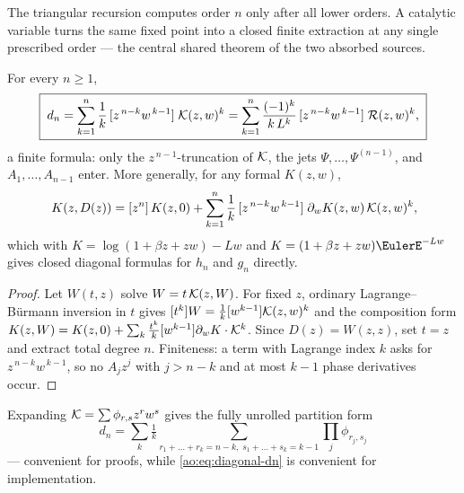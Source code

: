 The triangular recursion computes order $n$ only after all lower
orders.  A catalytic variable turns the same fixed point into a
closed finite extraction at any single prescribed order --- the
central shared theorem of the two absorbed sources.

\begin{theorem}
\label{ao:thm:diagonal}
For every $n\ge1$,
\begin{equation}
 \boxed{\;
 d_n=\sum_{k=1}^{n}\frac1k\,
 [z^{\,n-k}w^{\,k-1}]\;\mathcal K(z,w)^{k}
 =\sum_{k=1}^{n}\frac{(-1)^{k}}{k\,L^{k}}\,
 [z^{\,n-k}w^{\,k-1}]\;\mathcal R(z,w)^{k},
 \;}
 \label{ao:eq:diagonal-dn}
\end{equation}
a finite formula: only the $z^{\,n-1}$-truncation of $\mathcal K$, the jets
$\Psi,\dots,\Psi^{(n-1)}$, and $A_1,\dots,A_{n-1}$ enter.  More
generally, for any formal $K(z,w)$,
\begin{equation}
 [z^{n}]\,K(z,D(z))
 =[z^{n}]\,K(z,0)
 +\sum_{k=1}^{n}\frac1k\,
 [z^{\,n-k}w^{\,k-1}]\;
 \partial_wK(z,w)\,\EndpointKernel(z,w)^{k},
 \label{ao:eq:diagonal-composition}
\end{equation}
which with $K=\log(1+\beta z+zw)-Lw$ and
$K=(1+\beta z+zw)\EulerE^{-Lw}$ gives closed diagonal formulas for
$h_n$ and $g_n$ directly.
\end{theorem}

\begin{proof}
Let $W(t,z)$ solve $W=t\,\mathcal K(z,W)$.  For fixed $z$, ordinary
Lagrange--B\"urmann inversion in $t$ gives
$[t^{k}]W=\tfrac1k[w^{k-1}]\mathcal K(z,w)^{k}$ and the composition form
$K(z,W)=K(z,0)+\sum_k\tfrac{t^{k}}k[w^{k-1}]\partial_wK\cdot\mathcal K^{k}$.
Since $D(z)=W(z,z)$, set $t=z$ and extract total degree $n$.
Finiteness: a term with Lagrange index $k$ asks for
$z^{\,n-k}w^{\,k-1}$, so no $A_jz^{j}$ with $j>n-k$ and at most $k-1$
phase derivatives occur.
\end{proof}

Expanding $\mathcal K=\sum\phi_{r,s}z^{r}w^{s}$ gives the fully unrolled
partition form
\[
 d_n=\sum_k\tfrac1k
 \sum_{r_1+\dots+r_k=n-k,\;s_1+\dots+s_k=k-1}
 \prod_j\phi_{r_j,s_j}
\]
--- convenient for proofs, while
\eqref{ao:eq:diagonal-dn} is convenient for implementation.

